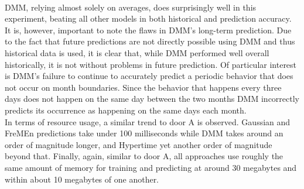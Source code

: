 \begin{table}[h!]
  \centering
  \caption{Door B Data Overview}
\end{table} \\

DMM, relying almost solely on averages, does surprisingly well in this
experiment, beating all other models in both historical and prediction
accuracy.  It is, however, important to note the flaws in DMM's long-term
prediction. Due to the fact that future predictions are not directly possible
using DMM and thus historical data is used, it is clear that,
while DMM performed well overall historically, it is not without problems
in future prediction. Of particular interest is DMM's failure to continue to
accurately predict a periodic behavior that does not occur on month
boundaries. Since the behavior that happens every three days does not happen
on the same day between the two months DMM incorrectly predicts its
occurrence as happening on the same days each month. \\

In terms of resource usage, a similar trend to door A is observed. Gaussian
and FreMEn predictions take under 100 milliseconds while DMM takes around
an order of magnitude longer, and Hypertime yet another order of magnitude
beyond that. Finally, again, similar to door A, all approaches use roughly the same amount
of memory for training and predicting at around 30 megabytes and
within about 10 megabytes of one another. \\

